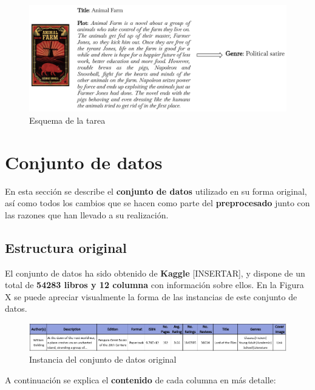 \documentclass[12pt,a4paper, xcolor=table]{article}
\begin{document}
\vspace{12mm}

  \begin{figure}[!h]
    \centering
    \includegraphics[width=450px]{img/Animal Farm.png}
    \caption{Esquema de la tarea}
    \end{figure}

\newpage

\section{Conjunto de datos}
    En esta sección se describe el \textbf{conjunto de datos} utilizado en su forma original, así como todos los cambios que se hacen como parte del \textbf{preprocesado} junto con las razones que han llevado a su realización.

    \subsection{Estructura original}
    El conjunto de datos ha sido obtenido de \textbf{Kaggle} [INSERTAR], y dispone de un total de \textbf{54283 libros y 12 columna} con información sobre ellos. En la Figura X se puede apreciar visualmente la forma de las instancias de este conjunto de datos.

    \vspace{3mm}

    \begin{figure}[!h]
        \centering
        \includegraphics[width=500px]{img/instancia_dataset_original.png}
        \caption{Instancia del conjunto de datos original}
    \end{figure}

    \vspace{3mm}

    A continuación se explica el \textbf{contenido} de cada columna en más detalle:
\end{document}
